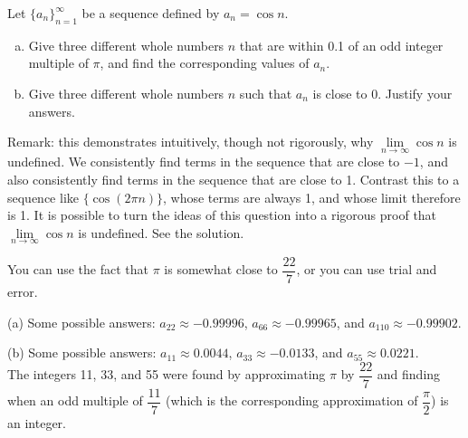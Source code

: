 \begin{question}
Let $\{a_n\}_{n=1}^\infty$ be a sequence defined by $a_n = \cos n$.
\begin{enumerate}[(a)]
\item Give three different whole numbers $n$ that are
within 0.1 of an odd integer multiple of $\pi$, and find the corresponding values of $a_n$.
\item Give three different whole numbers $n$ such that $a_n$ is close to $0$. Justify your answers.
\end{enumerate}
Remark: this demonstrates intuitively, though not rigorously, why $\lim\limits_{n \to \infty}\cos n$ is undefined. We consistently find terms in the sequence that are close to $-1$, and also consistently find terms in the sequence that are close to 1. Contrast this to a sequence like 
$\big\{\cos(2\pi n)\big\}$, whose terms are always 1, and whose limit therefore is 1.
It is possible to turn the ideas of this question into a rigorous proof that
$\lim\limits_{n \to \infty}\cos n$ is undefined. See the solution.
\end{question}
\begin{hint}
You can use the fact that $\pi$ is somewhat close to $\dfrac{22}{7}$, or you can use trial and error.
\end{hint}
\begin{answer}
(a) Some possible answers: $a_{22}\approx -0.99996$, $a_{66}\approx -0.99965$, and $a_{110}\approx -0.99902$.

(b) Some possible answers: $a_{11}\approx 0.0044$, $a_{33}\approx -0.0133$, and $a_{55}\approx 0.0221$. \\
The integers 11, 33, and 55 were found by approximating $\pi$ by $\dfrac{22}{7}$ and finding when an odd multiple of $\dfrac{11}{7}$ (which is the corresponding approximation of $\dfrac{\pi}{2}$) is an integer.
\end{answer}
